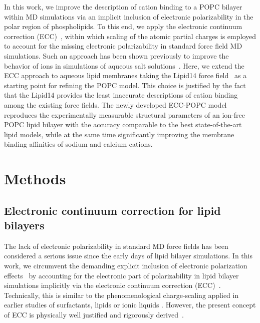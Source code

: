 \documentclass[journal=jpcbfk,manuscript=article]{achemso}
\begin{document}
In this work, we improve the description of cation binding to a POPC bilayer within MD simulations 
via an implicit inclusion of electronic polarizability in the polar region of phospholipids. 
To this end, we apply the electronic continuum correction (ECC)~\cite{leontyev11}, 
within which scaling of the atomic partial charges is employed to account for the missing electronic polarizability in standard force field MD simulations. 
Such an approach has been shown previously to improve the behavior of ions in simulations of aqueous salt solutions~\cite{martinek17, Pluharova2014, kohagen14, kohagen16}. Here, we extend the ECC approach to aqueous lipid membranes taking the Lipid14 force field~\cite{dickson14} as a starting point for refining the POPC model. This choice is justified by the fact that the Lipid14 provides the least inaccurate descriptions of cation binding among the existing force fields\cite{catte16}. 
The newly developed ECC-POPC model reproduces the experimentally
measurable structural parameters of an ion-free POPC lipid bilayer with the accuracy comparable to the best state-of-the-art lipid models, while at the same time significantly improving the membrane binding affinities of sodium and calcium cations.

\section{Methods}

\subsection{Electronic continuum correction for lipid bilayers}\label{section:ecc}
The lack of electronic polarizability in standard MD force fields has been considered a serious issue since the early days of lipid bilayer simulations. In this work, we circumvent the demanding explicit inclusion of electronic polarization effects~\cite{lucas12, chowdhary13} by accounting for the electronic part of polarizability in lipid bilayer simulations implicitly via the electronic continuum correction (ECC)~\cite{leontyev11}. Technically, this is similar to the phenomenological charge-scaling applied in earlier studies of surfactants, lipids or ionic liquids \cite{jonsson86, egberts94, beichel14}. However, the present concept of ECC is physically well justified and rigorously derived~\cite{leontyev09, leontyev10, leontyev11, leontyev14}.
\end{document}
